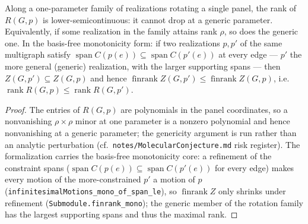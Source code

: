 \begin{lemma}
  \label{lem:rank-rotation-semicont}
  \leanok
  Along a one-parameter family of realizations rotating a single panel,
  the rank of $R(G,p)$ is lower-semicontinuous: it cannot drop at a
  generic parameter. Equivalently, if some realization in the family
  attains rank $\rho$, so does the generic one. In the basis-free
  monotonicity form: if two realizations $p, p'$ of the same multigraph
  satisfy $\operatorname{span} C(p(e)) \subseteq \operatorname{span} C(p'(e))$
  at every edge --- $p'$ the more general (generic) realization, with the
  larger supporting spans --- then $Z(G,p') \subseteq Z(G,p)$ and hence
  $\operatorname{finrank} Z(G,p') \le \operatorname{finrank} Z(G,p)$, i.e.\
  $\operatorname{rank} R(G,p) \le \operatorname{rank} R(G,p')$.
\end{lemma}
\begin{proof}
  \leanok
  The entries of $R(G,p)$ are polynomials in the panel coordinates, so a
  nonvanishing $\rho \times \rho$ minor at one parameter is a nonzero
  polynomial and hence nonvanishing at a generic parameter; the
  genericity argument is run rather than an analytic perturbation (cf.\
  \texttt{notes/MolecularConjecture.md} risk register). The
  formalization carries the basis-free monotonicity core: a refinement of
  the constraint spans ($\operatorname{span} C(p(e)) \subseteq
  \operatorname{span} C(p'(e))$ for every edge) makes every motion of the
  more-constrained $p'$ a motion of $p$
  (\texttt{infinitesimalMotions\_mono\_of\_span\_le}), so $\operatorname{finrank}
  Z$ only shrinks under refinement (\texttt{Submodule.finrank\_mono}); the
  generic member of the rotation family has the largest supporting spans
  and thus the maximal rank.
\end{proof}

